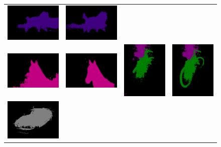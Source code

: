 \begin{figure}[H]
\begin{tabular}{c c c c}
    \includegraphics[width=0.18\linewidth, height=0.18\linewidth]{figures/ablation/withoutrfm/2011_002398_[11]} &
    \includegraphics[width=0.18\linewidth, height=0.18\linewidth]{figures/ablation/withrfm/2011_002398_[11]} \\
    [1mm]
    \includegraphics[width=0.18\linewidth, height=0.18\linewidth]{figures/ablation/withoutrfm/2007_009807_[12]} &
    \includegraphics[width=0.18\linewidth, height=0.18\linewidth]{figures/ablation/withrfm/2007_009807_[12]} & \hspace{2pt}
    \includegraphics[width=0.18\linewidth, height=0.18\linewidth]{figures/ablation/withoutrfm/2010_003912_[1, 4]} &
    \includegraphics[width=0.18\linewidth, height=0.18\linewidth]{figures/ablation/withrfm/2010_003912_[1, 4]} \\
    [1mm]
    \includegraphics[width=0.18\linewidth, height=0.18\linewidth]{figures/ablation/withoutrfm/2010_003276_[6]} &

\end{tabular}
\end{figure}
